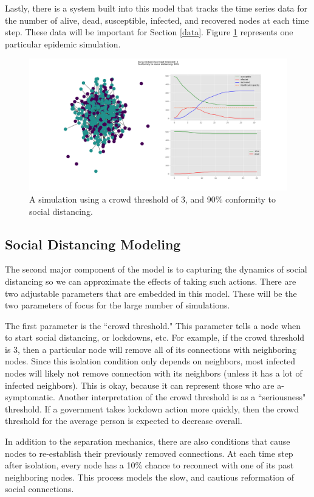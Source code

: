 \documentclass[12pt]{article}
\begin{document}
\begin{multicols}{2}
Lastly, there is a system built into this model that tracks the time series data for the number of alive, dead, susceptible, infected, and recovered nodes at each time step. These data will be important for Section \ref{data}. Figure \ref{plots} represents one particular epidemic simulation.
\begin{figure}[hbt!]
 \centering
 \includegraphics[width=\textwidth]{Figure_1.png}
 \caption{A simulation using a crowd threshold of 3, and 90\% conformity to social distancing.}
 \label{plots}
\end{figure}

\subsection{Social Distancing Modeling}
The second major component of the model is to capturing the dynamics of social distancing so we can approximate the effects of taking such actions.
There are two adjustable parameters that are embedded in this model.
These will be the two parameters of focus for the large number of simulations.

The first parameter is the ``crowd threshold."
This parameter tells a node when to start social distancing, or lockdowns, etc.
For example, if the crowd threshold is 3, then a particular node will remove all of its connections with neighboring nodes.
Since this isolation condition only depends on neighbors, most infected nodes will likely not remove connection with its neighbors (unless it has a lot of infected neighbors).
This is okay, because it can represent those who are a-symptomatic.
Another interpretation of the crowd threshold is as a ``seriousness" threshold.
If a government takes lockdown action more quickly, then the crowd threshold for the average person is expected to decrease overall.

In addition to the separation mechanics, there are also conditions that cause nodes to re-establish their previously removed connections.
At each time step after isolation, every node has a 10\% chance to reconnect with one of its past neighboring nodes.
This process models the slow, and cautious reformation of social connections.


\end{multicols}
\end{document}
